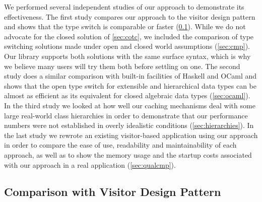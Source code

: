 We performed several independent studies of our approach to demonstrate its 
effectiveness. The first study compares our approach to the visitor design 
pattern and shows that the type switch is comparable or faster 
(\textsection\ref{sec:viscmp}). While we do not advocate for the closed solution 
of \textsection\ref{sec:cotc}, we included the comparison of type switching 
solutions made under open and closed world assumptions (\textsection\ref{sec:cmp}).
Our library supports both solutions with the same surface syntax, which is why 
we believe many users will try them both before settling on one.
The second study does a similar comparison with built-in facilities of Haskell 
and OCaml and shows that the open type switch for extensible and hierarchical 
data types can be almost as efficient as its equivalent for closed algebraic 
data types (\textsection\ref{sec:ocaml}). In the third study we looked at how 
well our caching mechanisms deal with some large real-world class hierarchies in 
order to demonstrate that our performance numbers were not established in overly 
idealistic conditions (\textsection\ref{sec:hierarchies}). In the last study we 
rewrote an existing visitor-based application using our approach in order to 
compare the ease of use, readability and maintainability of each approach, as 
well as to show the memory usage and the startup costs associated with our 
approach in a real application (\textsection\ref{sec:qualcmp}).

\subsection{Comparison with Visitor Design Pattern}
\label{sec:viscmp}

